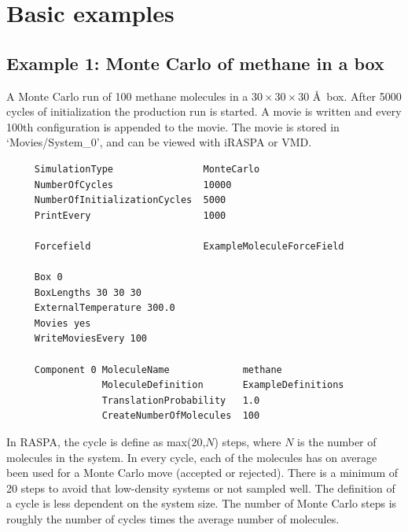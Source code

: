 \section{Basic examples}

\subsection*{Example 1: Monte Carlo of methane in a box}
A Monte Carlo run of 100 methane molecules in a $30\times30\times30$ \AA\ box.
After 5000 cycles of initialization the production run is started.
A movie is written and every 100th configuration is appended to the movie.
The movie is stored in `Movies/System\_0',
and can be viewed with iRASPA or VMD.

\begin{tiny}
\begin{verbatim}
     SimulationType                MonteCarlo
     NumberOfCycles                10000
     NumberOfInitializationCycles  5000
     PrintEvery                    1000

     Forcefield                    ExampleMoleculeForceField

     Box 0
     BoxLengths 30 30 30
     ExternalTemperature 300.0
     Movies yes
     WriteMoviesEvery 100

     Component 0 MoleculeName             methane
                 MoleculeDefinition       ExampleDefinitions
                 TranslationProbability   1.0
                 CreateNumberOfMolecules  100

\end{verbatim}
\end{tiny}

In RASPA, the cycle is define as max(20,$N$) steps, where $N$ is the number of molecules in the system. In every cycle, each of the molecules
has on average been used for a Monte Carlo move (accepted or rejected). There is a minimum of 20 steps to avoid that low-density
systems or not sampled well. The definition of a cycle is less dependent on the system size. The number of Monte Carlo steps
is roughly the number of cycles times the average number of molecules.

